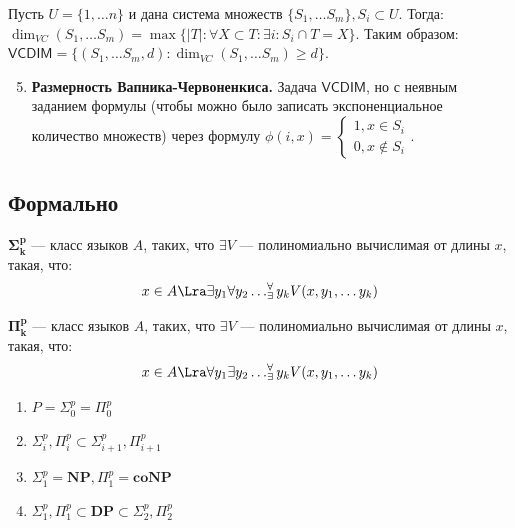 \begin{definition}
    Пусть \(U = \{1, \dots n\}\) и дана система множеств \(\{S_1, \dots S_m\}, S_i \subset U\). Тогда: \(\dim_{VC}(S_1, \dots S_m) = \max\{|T|: \forall X \subset T: \exists i: S_i \cap T = X\}\). Таким образом: \(\mathsf{VCDIM} = \{(S_1, \dots S_m, d): \dim_{VC}(S_1, \dots S_m) \ge d\}\).
\end{definition}

\begin{enumerate}
    \setcounter{enumi}{4}
    \item \textbf{Размерность Вапника-Червоненкиса.} Задача \(\mathsf{VCDIM}\), но с неявным заданием формулы (чтобы можно было записать экспоненциальное количество множеств) через формулу \(\phi(i, x) = \left\{\begin{array}{l}
        1, x \in S_i \\
        0, x \notin S_i
    \end{array}\right.\).
\end{enumerate}

\subsection{Формально}

\begin{definition}
    \(\mathbf{\Sigma_k^p}\) --- класс языков \(A\), таких, что \(\exists V\) --- полиномиально вычислимая от длины \(x\), такая, что:
    \[x \in A \Lra \exists y_1\forall y_2 \dots^\forall_\exists y_k V(x, y_1, \dots y_k)\]
\end{definition}

\begin{definition}
    \(\mathbf{\Pi_k^p}\) --- класс языков \(A\), таких, что \(\exists V\) --- полиномиально вычислимая от длины \(x\), такая, что:
    \[x \in A \Lra \forall y_1\exists y_2 \dots^\forall_\exists y_k V(x, y_1, \dots y_k)\]
\end{definition}

\begin{note}
    \begin{enumerate}
        \item \(P = \Sigma_0^p = \Pi_0^p\)
        \item \(\Sigma_i^p, \Pi_i^p \subset \Sigma_{i + 1}^p, \Pi_{i + 1}^p\)
        \item \(\Sigma_1^p = \mathbf{NP}, \Pi_1^p = \mathbf{coNP}\)
        \item \(\Sigma_1^p, \Pi_1^p \subset \mathbf{DP} \subset \Sigma_2^p, \Pi_2^p\)
    \end{enumerate}
\end{note}

